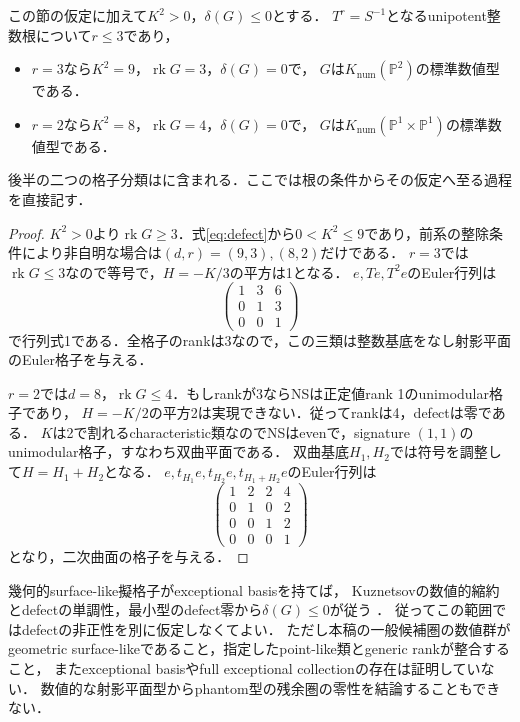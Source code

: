 \documentclass[11pt,a4paper]{ltjsarticle}
\begin{document}
\begin{corollary}[非正defectでの数値的指数上界]\label{cor:defect-index}
この節の仮定に加えて$K^2>0$，$\delta(G)\le0$とする．
$T^r=S^{-1}$となるunipotent整数根について$r\le3$であり，
\begin{itemize}
\item $r=3$なら$K^2=9$，$\operatorname{rk}G=3$，$\delta(G)=0$で，
$G$は$K_{\mathrm{num}}(\mathbb P^2)$の標準数値型である．
\item $r=2$なら$K^2=8$，$\operatorname{rk}G=4$，$\delta(G)=0$で，
$G$は$K_{\mathrm{num}}(\mathbb P^1\times\mathbb P^1)$の標準数値型である．
\end{itemize}
後半の二つの格子分類は\cite[Theorem 5.12]{Kuz}に含まれる．ここでは根の条件からその仮定へ至る過程を直接記す．
\end{corollary}
\begin{proof}
$K^2>0$より$\operatorname{rk}G\ge3$．式\eqref{eq:defect}から$0<K^2\le9$であり，前系の整除条件により非自明な場合は$(d,r)=(9,3),(8,2)$だけである．
$r=3$では$\operatorname{rk}G\le3$なので等号で，$H=-K/3$の平方は1となる．
$e,Te,T^2e$のEuler行列は
\[
 \begin{pmatrix}1&3&6\\0&1&3\\0&0&1\end{pmatrix}
\]
で行列式1である．全格子のrankは3なので，この三類は整数基底をなし射影平面のEuler格子を与える．

$r=2$では$d=8$，$\operatorname{rk}G\le4$．もしrankが3ならNSは正定値rank 1のunimodular格子であり，
$H=-K/2$の平方2は実現できない．従ってrankは4，defectは零である．
$K$は2で割れるcharacteristic類なのでNSはevenで，signature $(1,1)$のunimodular格子，すなわち双曲平面である．
双曲基底$H_1,H_2$では符号を調整して$H=H_1+H_2$となる．
$e,t_{H_1}e,t_{H_2}e,t_{H_1+H_2}e$のEuler行列は
\[
 \begin{pmatrix}1&2&2&4\\0&1&0&2\\0&0&1&2\\0&0&0&1\end{pmatrix}
\]
となり，二次曲面の格子を与える．
\end{proof}

\begin{remark}[例外基底がある場合と圏論的限界]\label{rem:defect-exceptional}
幾何的surface-like擬格子がexceptional basisを持てば，
Kuznetsovの数値的縮約とdefectの単調性，最小型のdefect零から$\delta(G)\le0$が従う
\cite[Corollary 5.7, Lemma 5.8, Theorem 5.9]{Kuz}．
従ってこの範囲ではdefectの非正性を別に仮定しなくてよい．
ただし本稿の一般候補圏の数値群がgeometric surface-likeであること，指定したpoint-like類とgeneric rankが整合すること，
またexceptional basisやfull exceptional collectionの存在は証明していない．
数値的な射影平面型からphantom型の残余圏の零性を結論することもできない．
\end{remark}
\end{document}
